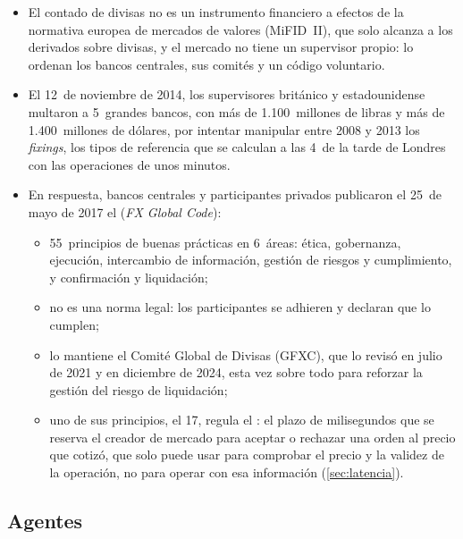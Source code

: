 \documentclass[11pt]{article}
\begin{document}
\begin{itemize}
\item El contado de divisas no es un instrumento financiero a efectos de la normativa europea de mercados de valores (MiFID~II), que solo alcanza a los derivados sobre divisas\nocite{UE2014MiFID2}, y el mercado no tiene un supervisor propio: lo ordenan los bancos centrales, sus comités y un código voluntario.
\item El 12~de noviembre de 2014, los supervisores británico y estadounidense multaron a 5~grandes bancos, con más de 1.100~millones de libras y más de 1.400~millones de dólares, por intentar manipular entre 2008 y 2013 los \emph{fixings}, los tipos de referencia que se calculan a las 4~de la tarde de Londres con las operaciones de unos minutos\nocite{FCA2014FX,CFTC2014FX}.
\item En respuesta, bancos centrales y participantes privados publicaron el 25~de mayo de 2017 el  (\emph{FX Global Code})\nocite{BIS2017CodigoGlobal}:
  \begin{itemize}
  \item 55~principios de buenas prácticas en 6~áreas: ética, gobernanza, ejecución, intercambio de información, gestión de riesgos y cumplimiento, y confirmación y liquidación;
  \item no es una norma legal: los participantes se adhieren y declaran que lo cumplen;
  \item lo mantiene el Comité Global de Divisas (GFXC), que lo revisó en julio de 2021 y en diciembre de 2024, esta vez sobre todo para reforzar la gestión del riesgo de liquidación\nocite{GFXC2021Revision,GFXC2025Revision};
  \item uno de sus principios, el 17, regula el : el plazo de milisegundos que se reserva el creador de mercado para aceptar o rechazar una orden al precio que cotizó, que solo puede usar para comprobar el precio y la validez de la operación, no para operar con esa información\nocite{GFXC2024Codigo} (\ref{sec:latencia}).
  \end{itemize}
\end{itemize}

\subsection{Agentes}\label{sec:agentes}
\end{document}
